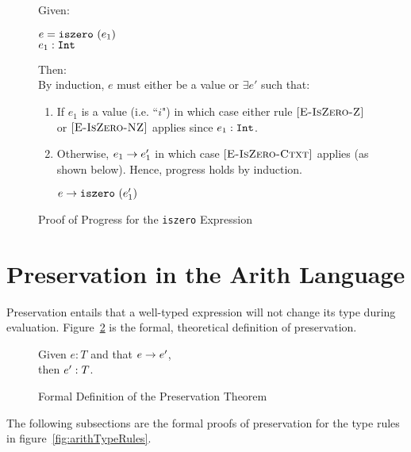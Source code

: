 \documentclass{report}
\newcommand{\rel}[1]{\mbox{\sc [#1]}}
\begin{document}
\begin{figure}[ht!]
Given:
\begin{center}
  $e = \mbox{\tt iszero}~(e_1)$ \\
  ${e_1} : {\mbox{\tt Int}}$
\end{center}
Then:~\\

By induction, $e$ must either be a value or $\exists e'$ such that:~\\

	\begin{enumerate}
    \item If $e_1$ is a value (i.e. ``$i$") in which case either rule $\rel{E-IsZero-Z}$ or $\rel{E-IsZero-NZ}$ applies since ${e_1} : {\mbox{\tt Int}}$.

    \item Otherwise, ${e_1} \rightarrow {e'_1}$ in which case $\rel{E-IsZero-Ctxt}$ applies (as shown below). Hence, progress holds by induction.
    
    \begin{center}
      ${e} \rightarrow {\mbox{\tt iszero}~(e'_1)}$
    \end{center}
	
	\end{enumerate}
	
  \caption{Proof of Progress for the \texttt{iszero} Expression}\label{fig:isZeroProofProgress}
\end{figure}

\eject
\section{Preservation in the Arith Language}\label{sec:preservation}

Preservation entails that a well-typed expression will not change its type during evaluation.  Figure~\ref{fig:preservationTheorem} is the formal, theoretical definition of preservation.

\begin{figure}[H]

	Given $e : T$ and that ${e} \rightarrow {e'}$,\\
	then ${e'} : {T}$.
	
  \caption{Formal Definition of the Preservation Theorem}\label{fig:preservationTheorem}
\end{figure}

The following subsections are the formal proofs of preservation for the type rules in figure~\ref{fig:arithTypeRules}. 
\end{document}
